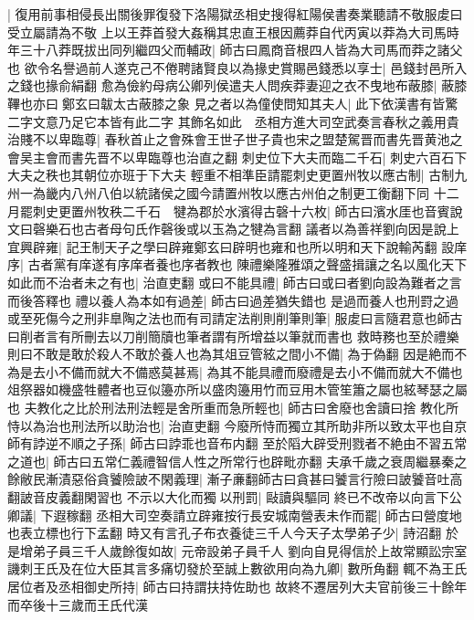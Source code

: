|{
	復用前事相侵長出關後罪復發下洛陽獄丞相史搜得紅陽侯書奏業聽請不敬服䖍曰受立屬請為不敬}
上以王莽首發大姦稱其忠直王根因薦莽自代丙寅以莽為大司馬時年三十八莽既拔出同列繼四父而輔政|{
	師古曰鳳商音根四人皆為大司馬而莽之諸父也}
欲令名譽過前人遂克己不倦聘諸賢良以為掾史賞賜邑錢悉以享士|{
	邑錢封邑所入之錢也掾俞絹翻}
愈為儉約母病公卿列侯遣夫人問疾莽妻迎之衣不曳地布蔽膝|{
	蔽膝鞸也亦曰鄭玄曰韍太古蔽膝之象}
見之者以為僮使問知其夫人|{
	此下依漢書有皆驚二字文意乃足它本皆有此二字}
其飾名如此　丞相方進大司空武奏言春秋之義用貴治賤不以卑臨尊|{
	春秋首止之會殊會王世子世子貴也宋之盟楚駕晋而書先晋黄池之會吴主會而書先晋不以卑臨尊也治直之翻}
刺史位下大夫而臨二千石|{
	刺史六百石下大夫之秩也其朝位亦班于下大夫}
輕重不相準臣請罷刺史更置州牧以應古制|{
	古制九州一為畿内八州八伯以統諸侯之國今請置州牧以應古州伯之制更工衡翻下同}
十二月罷刺史更置州牧秩二千石　犍為郡於水濱得古磬十六枚|{
	師古曰濱水厓也音賓說文曰磬樂石也古者母句氏作磬後或以玉為之犍為言翻}
議者以為善祥劉向因是說上宜興辟雍|{
	記王制天子之學曰辟雍鄭玄曰辟明也雍和也所以明和天下說輸芮翻}
設庠序|{
	古者黨有庠遂有序庠者養也序者教也}
陳禮樂隆雅頌之聲盛揖讓之名以風化天下如此而不治者未之有也|{
	治直吏翻}
或曰不能具禮|{
	師古曰或曰者劉向設為難者之言而後答釋也}
禮以養人為本如有過差|{
	師古曰過差猶失錯也}
是過而養人也刑罸之過或至死傷今之刑非臯陶之法也而有司請定法削則削筆則筆|{
	服䖍曰言隨君意也師古曰削者言有所刪去以刀削簡牘也筆者謂有所增益以筆就而書也}
救時務也至於禮樂則曰不敢是敢於殺人不敢於養人也為其俎豆管絃之間小不備|{
	為于偽翻}
因是絶而不為是去小不備而就大不備惑莫甚焉|{
	為其不能具禮而廢禮是去小不備而就大不備也俎祭器如機盛牲體者也豆似籩亦所以盛肉籩用竹而豆用木管笙簫之屬也絃琴瑟之屬也}
夫教化之比於刑法刑法輕是舍所重而急所輕也|{
	師古曰舍廢也舍讀曰捨}
教化所恃以為治也刑法所以助治也|{
	治直吏翻}
今廢所恃而獨立其所助非所以致太平也自京師有誖逆不順之子孫|{
	師古曰誖乖也音布内翻}
至於䧟大辟受刑戮者不絶由不習五常之道也|{
	師古曰五常仁義禮智信人性之所常行也辟毗亦翻}
夫承千歲之衰周繼暴秦之餘敝民漸漬惡俗貪饕險詖不閑義理|{
	漸子亷翻師古曰貪甚曰饕言行險曰詖饕音吐高翻詖音皮義翻閑習也}
不示以大化而獨以刑罰|{
	敺讀與驅同}
終已不改帝以向言下公卿議|{
	下遐稼翻}
丞相大司空奏請立辟雍按行長安城南營表未作而罷|{
	師古曰營度地也表立標也行下孟翻}
時又有言孔子布衣養徒三千人今天子太學弟子少|{
	詩沼翻}
於是增弟子員三千人歲餘復如故|{
	元帝設弟子員千人}
劉向自見得信於上故常顯訟宗室譏刺王氏及在位大臣其言多痛切發於至誠上數欲用向為九卿|{
	數所角翻}
輒不為王氏居位者及丞相御史所持|{
	師古曰持謂扶持佐助也}
故終不遷居列大夫官前後三十餘年而卒後十三歲而王氏代漢

